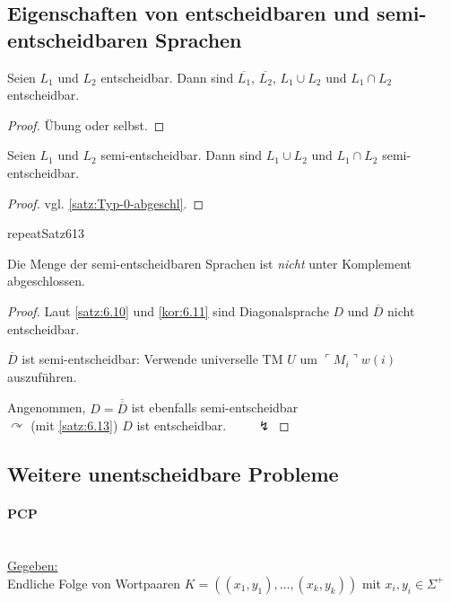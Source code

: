 \subsection{Eigenschaften von entscheidbaren und semi-entscheidbaren Sprachen}
\begin{Satz}[name={[Eigenschaften von Entscheidbarkeit]}]
\label{thm:eigensch-von-entsch}
  Seien $L_1$ und $L_2$ entscheidbar. Dann sind $\overline{L_1}$, $\overline{L_2}$, $L_1 \cup L_2$ und $L_1 \cap L_2$ entscheidbar.
\end{Satz}\vspace{-1.5em}
\begin{proof}
  Übung oder selbst.
\end{proof}
\begin{Satz}[name={[Eigenschaften von Semi-Entscheidbarkeit]}]
  Seien $L_1$ und $L_2$ semi-entscheidbar. Dann sind $L_1 \cup L_2$ und $L_1 \cap L_2$ semi-entscheidbar.
\end{Satz}
\begin{proof}
  vgl. \autoref{satz:Typ-0-abgeschl}.
\end{proof}
\csname repeatSatz613\endcsname*
\begin{Satz}
  Die Menge der semi-entscheidbaren Sprachen ist \emph{nicht}
  unter Komplement abgeschlossen.
\end{Satz}
\begin{proof}
  Laut \autoref{satz:6.10} und \autoref{kor:6.11} sind Diagonalsprache $D$ und $\overline{D}$ nicht entscheidbar.
  
  $\overline{D}$ ist semi-entscheidbar: Verwende universelle \ac{TM} $U$ um $\ulcorner M_i \urcorner w(i)$ auszuführen.
  
  Angenommen, $D=\overline{\overline{D}}$ ist ebenfalls semi-entscheidbar\\ $\curvearrowright$ (mit \autoref{satz:6.13}) $D$ ist entscheidbar. $\qquad\lightning$
\end{proof}


\subsection{Weitere unentscheidbare Probleme}
\paragraph[\acf*{PCP}]{\acf{PCP}}\ \\
\underline{Gegeben:}\\
Endliche Folge von Wortpaaren $K=((x_1, y_1), \dots, (x_k, y_k))$ mit $x_i, y_i \in \Sigma^+$

